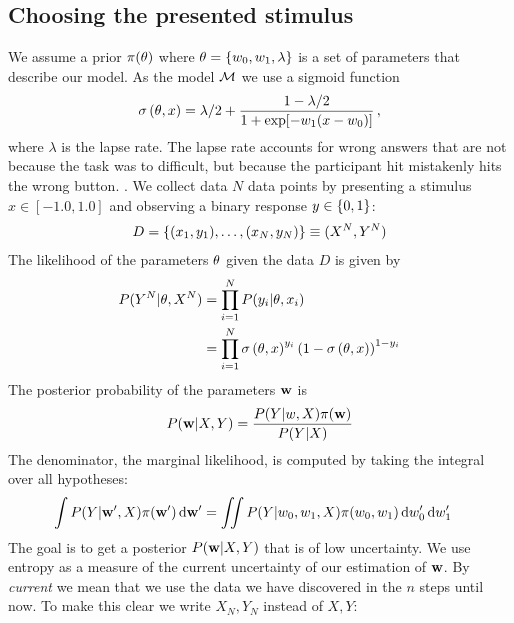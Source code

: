 \subsection{Choosing the presented stimulus} %
\label{sub:choosing_the_presented_stimulus}
We assume a prior ${\pi(\theta)}$ where $\theta  = \left\{ w_0, w_1, \lambda \right\}$ is a set of parameters that describe our model.
As the model $\mathcal{M}$ we use a sigmoid function
\begin{align}
	{\sigma \left(\theta, x\right)} = \lambda / 2 + \frac{1-\lambda / 2}{1 + \exp[-w_1(x - w_0)]} \,,
\end{align}
where $\lambda$ is the lapse rate. The lapse rate accounts for wrong answers that are not because the task was to difficult, but because the participant hit mistakenly hits the wrong button.
.
We collect data $N$ data points by presenting a stimulus $x \in [-1.0, 1.0]$ and observing a binary response $y \in \left\{ 0, 1 \right\}$:
\begin{align}
	 D = \left\{ (x_1, y_1), \dots, (x_N, y_N) \right\} \equiv (X^N, Y^N)
\end{align}
The likelihood of the parameters $\theta$ given the data $D$ is given by
\begin{align}
	{P(Y^N | \theta, X^N)}
	&= \prod_{i=1}^N {P(y_i | \theta, x_i)} \\
	&= \prod_{i=1}^N {\sigma \left(\theta, x\right)}^{y_i}
		\left( 1 - {\sigma \left(\theta, x\right)} \right)^{1-y_i}
\end{align}
The posterior probability of the parameters ${\bf w}$ is
\begin{align}
	{P({\bf w} | X, Y)} = \frac{{P(Y | w, X)} {\pi({\bf w})}}{{P(Y | X)}}
\end{align}
The denominator, \ie the marginal likelihood, is computed by taking the integral over all hypotheses:
\begin{align}
	\int {P(Y | {\bf w}', X)} {\pi({\bf w}')} \,\mathrm{d} {\bf w}'
	&= \iint {P(Y | w_0, w_1, X)} {\pi(w_0, w_1)} \,\mathrm{d} w_0' \,\mathrm{d} w_1'
\end{align}
The goal is to get a posterior ${P({\bf w} | X, Y)}$ that is of low uncertainty. We use entropy as a measure of the current uncertainty of our estimation of ${\bf w}$. By \emph{current} we mean that we use the data we have discovered in the $n$ steps until now. To make this clear we write $X_N, Y_N$ instead of $X, Y$:
